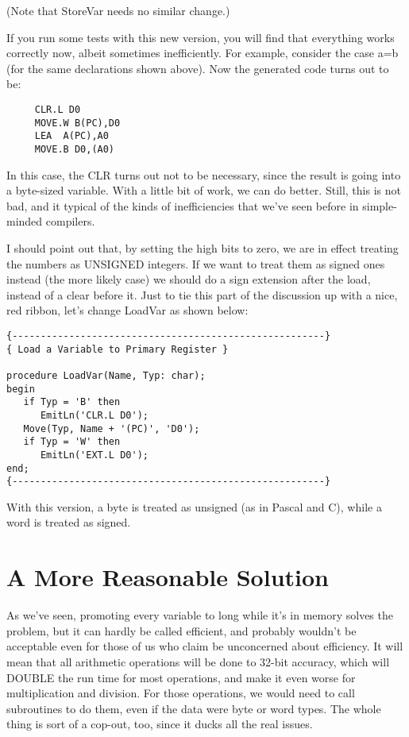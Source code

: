 (Note that StoreVar needs no similar change.)

If you run some tests with  this  new version, you will find that everything  works correctly now, albeit sometimes  inefficiently. For example, consider the case  a=b  (for  the  same declarations shown above). Now the generated code turns out to be:

\begin{verbatim}
     CLR.L D0
     MOVE.W B(PC),D0
     LEA  A(PC),A0
     MOVE.B D0,(A0)
\end{verbatim}

In  this  case, the CLR turns out not to be necessary, since the result is going into a byte-sized variable. With a little bit of work, we can do better. Still, this is not  bad, and it typical of the kinds of inefficiencies  that we've seen before in simple- minded compilers.

I should point out that, by setting the high bits to zero, we are in effect treating the numbers as UNSIGNED integers. If  we want to treat them as signed ones instead (the more  likely  case)  we should do a  sign  extension  after  the load, instead of a clear before it. Just  to  tie  this  part  of the discussion up with a nice, red ribbon, let's change LoadVar as shown below:

\begin{verbatim}
{-------------------------------------------------------}
{ Load a Variable to Primary Register }

procedure LoadVar(Name, Typ: char);
begin
   if Typ = 'B' then
      EmitLn('CLR.L D0');
   Move(Typ, Name + '(PC)', 'D0');
   if Typ = 'W' then
      EmitLn('EXT.L D0');
end;
{-------------------------------------------------------}
\end{verbatim}

With this version, a byte is treated as unsigned  (as  in  Pascal and C), while a word is treated as signed.

\section{A More Reasonable Solution}

As we've seen, promoting  every  variable  to  long while it's in memory solves the problem, but it can hardly be called efficient, and  probably wouldn't be acceptable even for  those  of  us  who claim be unconcerned about  efficiency. It  will mean that all arithmetic operations will be done to 32-bit accuracy, which will DOUBLE the run time  for  most operations, and make it even worse for multiplication  and division. For those operations, we would need to call subroutines to do  them, even if the data were byte or  word types. The whole thing is sort of a cop-out, too, since it ducks all the real issues.

